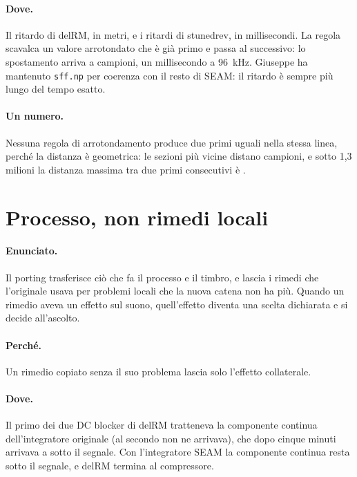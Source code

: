 \paragraph{Dove.}
Il ritardo di delRM, in metri, e i ritardi di stunedrev, in millisecondi.
La regola scavalca un valore arrotondato che è già primo e passa al successivo: lo spostamento arriva a  campioni, un millisecondo a \qty{96}{\kilo\hertz}.
Giuseppe ha mantenuto \texttt{sff.np} per coerenza con il resto di SEAM: il ritardo è sempre più lungo del tempo esatto.

\paragraph{Un numero.}
Nessuna regola di arrotondamento produce due primi uguali nella stessa linea, perché la distanza è geometrica: le sezioni più vicine distano  campioni, e sotto 1,3 milioni la distanza massima tra due primi consecutivi è .

\section{Processo, non rimedi locali}\label{sec:principio-processo}
\paragraph{Enunciato.}
Il porting trasferisce ciò che fa il processo e il timbro, e lascia i rimedi che l'originale usava per problemi locali che la nuova catena non ha più.
Quando un rimedio aveva un effetto sul suono, quell'effetto diventa una scelta dichiarata e si decide all'ascolto.

\paragraph{Perché.}
Un rimedio copiato senza il suo problema lascia solo l'effetto collaterale.

\paragraph{Dove.}
Il primo dei due DC blocker di delRM tratteneva la componente continua dell'integratore originale (al secondo non ne arrivava), che dopo cinque minuti arrivava a  sotto il segnale.
Con l'integratore SEAM la componente continua resta  sotto il segnale, e delRM termina al compressore.

